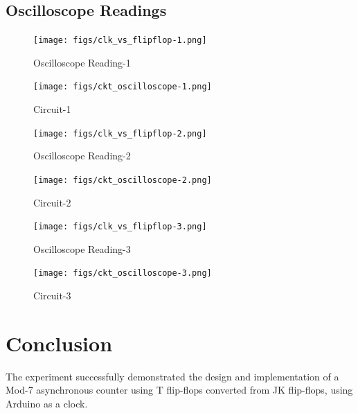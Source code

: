 \documentclass{article}
\begin{document}
\subsection{Oscilloscope Readings}
\begin{figure}[h!]
        \centering
		\caption{Oscilloscope Reading-1}
		\texttt{[image: figs/clk\_vs\_flipflop-1.png]}
\end{figure}
\pagebreak
\begin{figure}[h!]
        \centering
		\caption{Circuit-1}
		\texttt{[image: figs/ckt\_oscilloscope-1.png]}
\end{figure}
\begin{figure}[h!]
        \centering
		\caption{Oscilloscope Reading-2}
		\texttt{[image: figs/clk\_vs\_flipflop-2.png]}
\end{figure}
\begin{figure}[h!]
        \centering
		\caption{Circuit-2}
		\texttt{[image: figs/ckt\_oscilloscope-2.png]}
\end{figure}
\begin{figure}[h!]
        \centering
		\caption{Oscilloscope Reading-3}
		\texttt{[image: figs/clk\_vs\_flipflop-3.png]}
\end{figure}
\begin{figure}[h!]
        \centering
		\caption{Circuit-3}
		\texttt{[image: figs/ckt\_oscilloscope-3.png]}
\end{figure}

\section{Conclusion}
The experiment successfully demonstrated the design and implementation of a Mod-7 asynchronous counter using T flip-flops converted from JK flip-flops, using Arduino as a clock.
\end{document}

